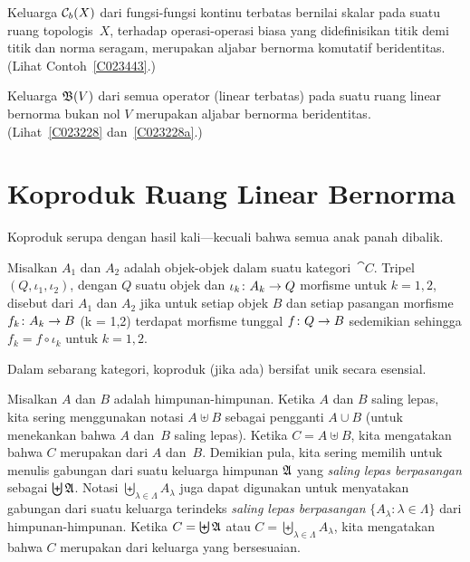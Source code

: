 \begin{exam}\label{C023454} Keluarga $\mathcal{C}_b(X)$ dari fungsi-fungsi kontinu terbatas bernilai skalar
pada suatu ruang topologis~$X$, terhadap operasi-operasi biasa yang didefinisikan titik demi titik dan
norma seragam, merupakan aljabar bernorma komutatif beridentitas. (Lihat Contoh~\ref{C023443}.)
\end{exam}

\begin{exam}\label{C023456} Keluarga $\mathfrak{B}(V)$ dari semua operator (linear terbatas)
pada suatu ruang linear bernorma bukan nol $V$ merupakan aljabar bernorma beridentitas. (Lihat~\ref{C023228} dan~\ref{C023228a}.)
\end{exam}

\section{Koproduk Ruang Linear Bernorma}\label{C0156}
Koproduk serupa dengan hasil kali---kecuali bahwa semua anak panah dibalik.

\begin{defn}\label{C015611} Misalkan $A_1$ dan $A_2$ adalah objek-objek dalam suatu kategori~$\cat C$. Tripel
$(Q,\iota_1,\iota_2)$, dengan $Q$ suatu objek dan $\iota_k\colon A_k \rightarrow Q$ morfisme untuk $k=1,2$, disebut
 dari $A_1$ dan $A_2$ jika untuk setiap objek $B$ dan setiap pasangan morfisme
$f_k\colon A_k \rightarrow B$ (k = 1,2) terdapat morfisme tunggal $f\colon Q \rightarrow B$ sedemikian
sehingga $f_k = f \circ \iota_k$ untuk $k = 1,2$.
\end{defn}

\begin{prop} Dalam sebarang kategori, koproduk (jika ada) bersifat
unik secara esensial.
\end{prop}

\begin{defn}\label{C0006127} Misalkan $A$ dan $B$ adalah himpunan-himpunan. Ketika $A$ dan $B$ saling lepas, kita
sering menggunakan notasi
$A \uplus B$ sebagai pengganti $A \cup B$ (untuk menekankan bahwa $A$ dan~$B$ saling lepas). Ketika
$C = A \uplus B$, kita mengatakan bahwa $C$ merupakan
 dari $A$ dan~$B$. Demikian pula, kita sering memilih untuk menulis gabungan dari
suatu keluarga himpunan $\mathfrak{A}$ yang \emph{saling lepas berpasangan} sebagai $\biguplus\mathfrak{A}$. Notasi
$\biguplus_{\lambda \in \Lambda} A_\lambda$ juga dapat digunakan untuk menyatakan gabungan dari suatu
keluarga terindeks \emph{saling lepas berpasangan} $\{A_\lambda\colon  \lambda \in \Lambda\}$ dari
himpunan-himpunan. Ketika $C = \biguplus\mathfrak{A}$ atau $C = \biguplus_{\lambda \in \Lambda} A_\lambda$, kita
mengatakan bahwa $C$ merupakan  dari keluarga yang bersesuaian.
\end{defn}

